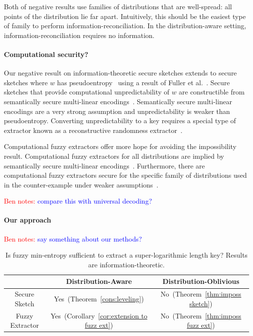 \documentclass[11pt]{article}
\newcommand{\thref}[1]{\mbox{Theorem~\ref{#1}}}
\newcommand{\corref}[1]{\mbox{Corollary~\ref{#1}}}
\newcommand{\Hfuzz}{\mathrm{H}^{\mathtt{fuzz}}_{t,\infty}}
\newcommand{\authnote}[2]{{\textcolor{red}{\textsf{#1 notes: }\textcolor{blue}{ #2}}\marginpar{\textcolor{red}{\textbf{!!!!!}}}}}
\newcommand{\authnote}[2]{}
\newcommand{\bnote}[1]{{\authnote{Ben}{#1}}}
\begin{document}
Both of negative results use families of distributions that are well-spread: all points of the distribution lie far apart.  Intuitively, this should be the easiest type of family to perform information-reconciliation.  In the distribution-aware setting, information-reconciliation requires no information.

\paragraph{Computational security?}
Our negative result on information-theoretic secure sketches extends to secure sketches where $w$ has pseudoentropy~\cite{DBLP:journals/siamcomp/HastadILL99} using a result of Fuller et al.~\cite{fuller2013computational}.  Secure sketches that provide computational unpredictability of $w$ are constructible from semantically secure multi-linear encodings~\cite{BitanskyCKP14}.  Semantically secure multi-linear encodings are a very strong assumption and unpredictability is weaker than pseudoentropy.  Converting unpredictability to a key requires a special type of extractor known as a reconstructive randomness extractor~\cite{barak-computational, DBLP:conf/eurocrypt/HsiaoLR07}.  

Computational fuzzy extractors offer more hope for avoiding the impossibility result.  Computational fuzzy extractors for all distributions are implied by semantically secure multi-linear encodings~\cite{BitanskyCKP14}.  Furthermore, there are computational fuzzy extractors secure for the specific family of distributions used in the counter-example under weaker assumptions~\cite[Construction 5.3]{canetti2014key}.

\bnote{compare this with universal decoding?}

\paragraph{Our approach} \bnote{say something about our methods?}
\begin{table}
\begin{center}
\begin{tabular}{c | c | c }
& Distribution-Aware & Distribution-Oblivious\\
\hline
Secure Sketch & Yes~(\thref{cons:leveling}) & No~(\thref{thm:imposs sketch})\\
\hline
Fuzzy Extractor & Yes~(\corref{cor:extension to fuzz ext}) & No~(\thref{thm:imposs fuzz ext})
\end{tabular}
\end{center}
\caption{Is fuzzy min-entropy sufficient to extract a super-logarithmic length key?  Results are information-theoretic.}
\label{tab:main results}
\end{table}
\end{document}
